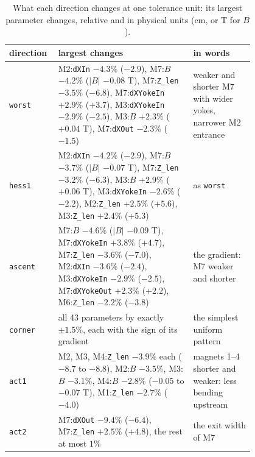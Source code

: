 \documentclass[11pt,a4paper]{article}
\begin{document}
\begin{table}[t]
\centering
\caption{What each direction changes at one tolerance unit: its largest parameter changes,
relative and in physical units (cm, or T for $B$).}
\label{tab:dirs}
\small
\begin{tabular}{l p{0.55\linewidth} p{0.25\linewidth}}
\toprule
direction & largest changes & in words \\
\midrule
\texttt{worst}  & M2:\texttt{dXIn} $-4.3\%$ ($-2.9$), M7:$B$ $-4.2\%$ ($|B|$ $-0.08$ T),
                  M7:\texttt{Z\_len} $-3.5\%$ ($-6.8$), M7:\texttt{dXYokeIn} $+2.9\%$ ($+3.7$),
                  M3:\texttt{dXYokeIn} $-2.9\%$ ($-2.5$), M3:$B$ $+2.3\%$ ($+0.04$ T),
                  M7:\texttt{dXOut} $-2.3\%$ ($-1.5$)
                & weaker and shorter M7 with wider yokes, narrower M2 entrance \\
\midrule
\texttt{hess1}  & M2:\texttt{dXIn} $-4.2\%$ ($-2.9$), M7:$B$ $-3.7\%$ ($|B|$ $-0.07$ T),
                  M7:\texttt{Z\_len} $-3.2\%$ ($-6.3$), M3:$B$ $+2.9\%$ ($+0.06$ T),
                  M3:\texttt{dXYokeIn} $-2.6\%$ ($-2.2$), M2:\texttt{Z\_len} $+2.5\%$ ($+5.6$),
                  M3:\texttt{Z\_len} $+2.4\%$ ($+5.3$)
                & as \texttt{worst} \\
\midrule
\texttt{ascent} & M7:$B$ $-4.6\%$ ($|B|$ $-0.09$ T), M7:\texttt{dXYokeIn} $+3.8\%$ ($+4.7$),
                  M7:\texttt{Z\_len} $-3.6\%$ ($-7.0$), M2:\texttt{dXIn} $-3.6\%$ ($-2.4$),
                  M3:\texttt{dXYokeIn} $-2.9\%$ ($-2.5$), M7:\texttt{dXYokeOut} $+2.3\%$ ($+2.2$),
                  M6:\texttt{Z\_len} $-2.2\%$ ($-3.8$)
                & the gradient: M7 weaker and shorter \\
\midrule
\texttt{corner} & all 43 parameters by exactly $\pm1.5\%$, each with the sign of its gradient
                & the simplest uniform pattern \\
\midrule
\texttt{act1}   & M2, M3, M4:\texttt{Z\_len} $-3.9\%$ each ($-8.7$ to $-8.8$), M2:$B$ $-3.5\%$,
                  M3:$B$ $-3.1\%$, M4:$B$ $-2.8\%$ ($-0.05$ to $-0.07$ T), M1:\texttt{Z\_len}
                  $-2.7\%$ ($-4.0$)
                & magnets 1--4 shorter and weaker: less bending upstream \\
\midrule
\texttt{act2}   & M7:\texttt{dXOut} $-9.4\%$ ($-6.4$), M7:\texttt{Z\_len} $+2.5\%$ ($+4.8$), the
                  rest at most $1\%$
                & the exit width of M7 \\
\bottomrule
\end{tabular}
\end{table}
\end{document}
